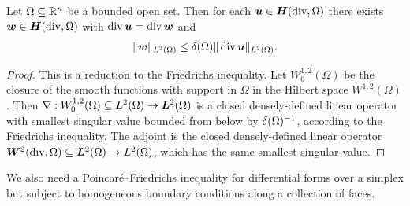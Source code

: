 \documentclass[10pt,letterpaper]{article}
\begin{document}
\begin{lemma}\label{lemma:PFfordivergence}
    Let $\Omega \subseteq {\mathbb R}^{n}$ be a bounded open set. 
    Then for each $\bm{u} \in \bm{H}(\operatorname{div},\Omega)$ there exists $\bm{w} \in \bm{H}(\operatorname{div},\Omega)$ with $\operatorname{div} \bm{u} = \operatorname{div} \bm{w}$ and 
    \begin{align*}
        \| \bm{w} \|_{L^{2}(\Omega)} 
        \leq 
        {\delta}(\Omega) \| \operatorname{div} \bm{u} \|_{L^{2}(\Omega)}
        .
    \end{align*}
\end{lemma}
\begin{proof}
    This is a reduction to the Friedrichs inequality. 
    Let $W^{1,2}_{0}(\Omega)$ be the closure of the smooth functions with support in $\Omega$ in the Hilbert space $W^{1,2}(\Omega)$. 
    Then $\nabla : W^{1,2}_{0}(\Omega) \subseteq L^{2}(\Omega) \rightarrow \bm{L}^{2}(\Omega)$ is a closed densely-defined linear operator 
    with smallest singular value bounded from below by ${\delta}(\Omega)^{-1}$, according to the Friedrichs inequality. 
    The adjoint is the closed densely-defined linear operator $\bm{W}^{2}(\operatorname{div},\Omega) \subseteq \bm{L}^{2}(\Omega) \rightarrow L^{2}(\Omega)$,
    which has the same smallest singular value. 
\end{proof}






We also need a Poincar\'e--Friedrichs inequality for differential forms over a simplex but subject to homogeneous boundary conditions along a collection of faces. 
\end{document}
